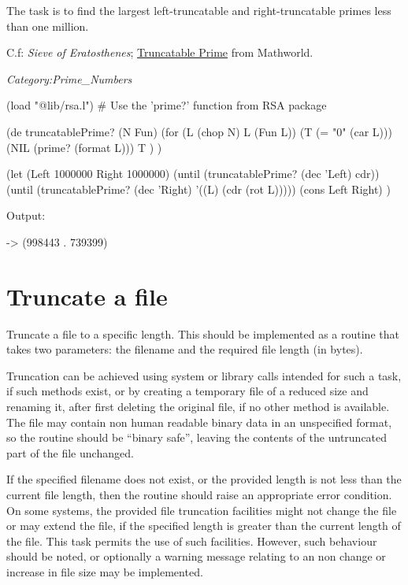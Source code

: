 The task is to find the largest left-truncatable and right-truncatable
primes less than one million.

C.f: \emph{Sieve of Eratosthenes};
\href{http://mathworld.wolfram.com/TruncatablePrime.html}{Truncatable
Prime} from Mathworld.

\emph{Category:Prime\_Numbers}


\begin{wideverbatim}

(load "@lib/rsa.l")  # Use the 'prime?' function from RSA package

(de truncatablePrime? (N Fun)
   (for (L (chop N) L (Fun L))
      (T (= "0" (car L)))
      (NIL (prime? (format L)))
      T ) )

(let (Left 1000000  Right 1000000)
   (until (truncatablePrime? (dec 'Left) cdr))
   (until (truncatablePrime? (dec 'Right) '((L) (cdr (rot L)))))
   (cons Left Right) )

Output:

-> (998443 . 739399)

\end{wideverbatim}

\pagebreak{}
\section*{Truncate a file}

Truncate a file to a specific length. This should be implemented as a
routine that takes two parameters: the filename and the required file
length (in bytes).

Truncation can be achieved using system or library calls intended for
such a task, if such methods exist, or by creating a temporary file of a
reduced size and renaming it, after first deleting the original file, if
no other method is available. The file may contain non human readable
binary data in an unspecified format, so the routine should be ``binary
safe'', leaving the contents of the untruncated part of the file
unchanged.

If the specified filename does not exist, or the provided length is not
less than the current file length, then the routine should raise an
appropriate error condition. On some systems, the provided file
truncation facilities might not change the file or may extend the file,
if the specified length is greater than the current length of the file.
This task permits the use of such facilities. However, such behaviour
should be noted, or optionally a warning message relating to an non
change or increase in file size may be implemented.



